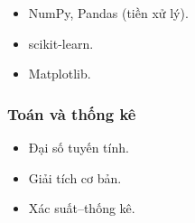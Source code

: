 \begin{phuongphap}[title={Thư viện gợi ý}]
\begin{itemize}
  \item NumPy, Pandas (tiền xử lý).
  \item scikit-learn.
  \item Matplotlib.
\end{itemize}
\end{phuongphap}

\subsubsection{Toán và thống kê}

\begin{phuongphap}[title={Mức toán cần thiết}]
\begin{itemize}
  \item Đại số tuyến tính.
  \item Giải tích cơ bản.
  \item Xác suất--thống kê.
\end{itemize}
\end{phuongphap}

